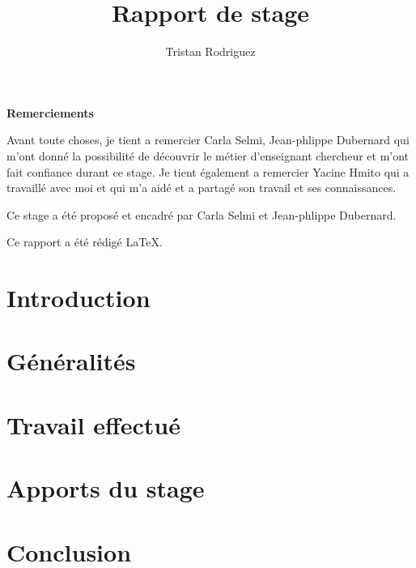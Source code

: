 \documentclass{univ-projet}
\author{Tristan Rodriguez}
\title{Rapport de stage}
\begin{document}
  \maketitle
    \begin{center}
      \textbf{Remerciements}

      Avant toute choses, je tient a remercier Carla Selmi, Jean-phlippe Dubernard qui m'ont donné la possibilité de découvrir le métier d'enseignant chercheur et m'ont fait confiance durant ce stage. Je tient également a remercier Yacine Hmito qui a travaillé avec moi et qui m'a aidé et a partagé son travail et ses connaissances.

      Ce stage a  été proposé et encadré par Carla Selmi et Jean-phlippe Dubernard.

      Ce rapport a été rédigé \LaTeX.
    \end{center}

  \clearpage
  
  \tableofcontents
  \clearpage

  \section{Introduction}
  \label{sec:Introduction}
  
  
  \section{Généralités}
  \label{sec:généralités}
  
    
  \section{Travail effectué}
  \label{sec:Travail effectué}
  

  \section{Apports du stage}
  \label{Apports du stage}
  
  
  \section{Conclusion}
  \label{sec:conclusion}
  
  \clearpage

  \nocite{*}
  
  
  
\end{document}
